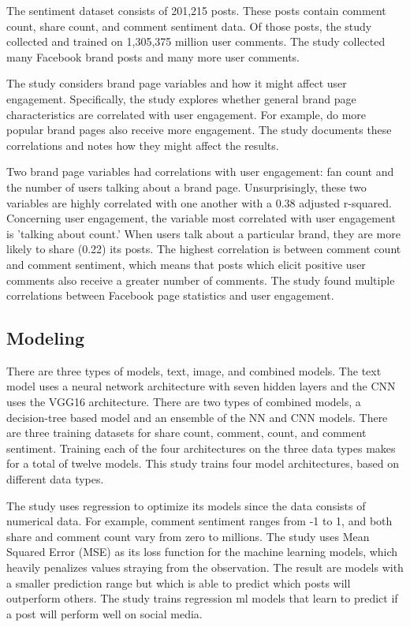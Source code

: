 \documentclass[mksc,blindrev]{informs3} %
\begin{document}
The sentiment dataset consists of 201,215 posts. These posts contain comment count, share count, and comment sentiment data. Of those posts, the study collected and trained on 1,305,375 million user comments. The study collected many Facebook brand posts and many more user comments.

The study considers brand page variables and how it might affect user engagement. Specifically, the study explores whether general brand page characteristics are correlated with user engagement. For example, do more popular brand pages also receive more engagement. The study documents these correlations and notes how they might affect the results.  

Two brand page variables had correlations with user engagement: fan count and the number of users talking about a brand page. Unsurprisingly, these two variables are highly correlated with one another with a 0.38 adjusted r-squared. Concerning user engagement, the variable most correlated with user engagement is 'talking about count.' When users talk about a particular brand, they are more likely to share (0.22) its posts. The highest correlation is between comment count and comment sentiment, which means that posts which elicit positive user comments also receive a greater number of comments. The study found multiple correlations between Facebook page statistics and user engagement.

\subsection{Modeling}

There are three types of models, text, image, and combined models. The text model uses a neural network architecture with seven hidden layers and the CNN uses the VGG16 architecture. There are two types of combined models, a decision-tree based model and an ensemble of the NN and CNN models. There are three training datasets for share count, comment, count, and comment sentiment. Training each of the four architectures on the three data types makes for a total of twelve models. This study trains four model architectures, based on different data types.

The study uses regression to optimize its models since the data consists of numerical data. For example, comment sentiment ranges from -1 to 1, and both share and comment count vary from zero to millions. The study uses Mean Squared Error (MSE) as its loss function for the machine learning models, which heavily penalizes values straying from the observation. The result are models with a smaller prediction range but which is able to predict which posts will outperform others. The study trains regression ml models that learn to predict if a post will perform well on social media.
\end{document}
